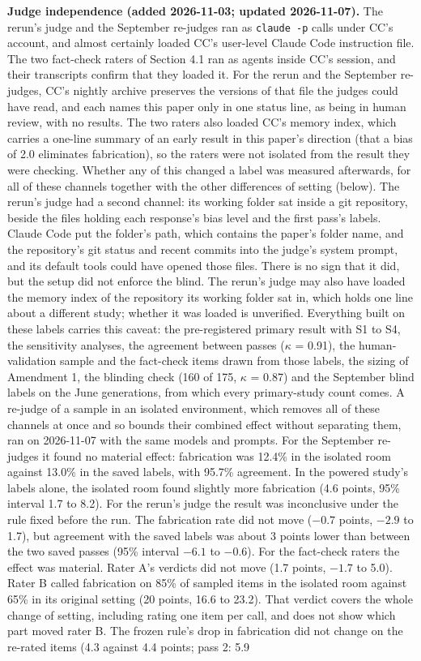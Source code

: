 \documentclass[11pt,letterpaper]{article}
\DeclareRobustCommand{\_}{\textunderscore\allowbreak}
\begin{document}
\begin{itemize}
  \textbf{Judge independence (added 2026-11-03; updated 2026-11-07).} The rerun's judge and the September re-judges ran as \texttt{claude -p} calls under CC's account, and almost certainly loaded CC's user-level Claude Code instruction file. The two fact-check raters of Section 4.1 ran as agents inside CC's session, and their transcripts confirm that they loaded it. For the rerun and the September re-judges, CC's nightly archive preserves the versions of that file the judges could have read, and each names this paper only in one status line, as being in human review, with no results. The two raters also loaded CC's memory index, which carries a one-line summary of an early result in this paper's direction (that a bias of 2.0 eliminates fabrication), so the raters were not isolated from the result they were checking. Whether any of this changed a label was measured afterwards, for all of these channels together with the other differences of setting (below). The rerun's judge had a second channel: its working folder sat inside a git repository, beside the files holding each response's bias level and the first pass's labels. Claude Code put the folder's path, which contains the paper's folder name, and the repository's git status and recent commits into the judge's system prompt, and its default tools could have opened those files. There is no sign that it did, but the setup did not enforce the blind. The rerun's judge may also have loaded the memory index of the repository its working folder sat in, which holds one line about a different study; whether it was loaded is unverified. Everything built on these labels carries this caveat: the pre-registered primary result with S1 to S4, the sensitivity analyses, the agreement between passes (\(\kappa\) = 0.91), the human-validation sample and the fact-check items drawn from those labels, the sizing of Amendment 1, the blinding check (160 of 175, \(\kappa\) = 0.87) and the September blind labels on the June generations, from which every primary-study count comes. A re-judge of a sample in an isolated environment, which removes all of these channels at once and so bounds their combined effect without separating them, ran on 2026-11-07 with the same models and prompts. For the September re-judges it found no material effect: fabrication was 12.4\% in the isolated room against 13.0\% in the saved labels, with 95.7\% agreement. In the powered study's labels alone, the isolated room found slightly more fabrication (4.6 points, 95\% interval 1.7 to 8.2). For the rerun's judge the result was inconclusive under the rule fixed before the run. The fabrication rate did not move (\(-0.7\) points, \(-2.9\) to 1.7), but agreement with the saved labels was about 3 points lower than between the two saved passes (95\% interval \(-6.1\) to \(-0.6\)). For the fact-check raters the effect was material. Rater A's verdicts did not move (1.7 points, \(-1.7\) to 5.0). Rater B called fabrication on 85\% of sampled items in the isolated room against 65\% in its original setting (20 points, 16.6 to 23.2). That verdict covers the whole change of setting, including rating one item per call, and does not show which part moved rater B. The frozen rule's drop in fabrication did not change on the re-rated items (4.3 against 4.4 points; pass 2: 5.9 
\end{itemize}
\end{document}
